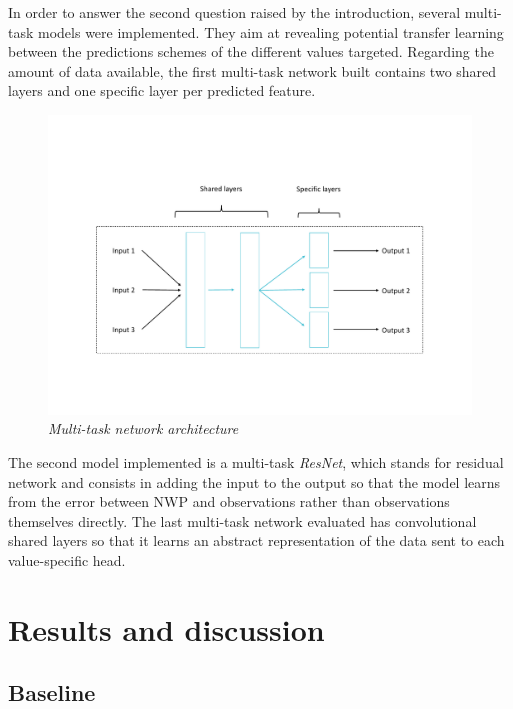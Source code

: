 \documentclass{article}
\newcommand{\saut}{\vspace{10px}}
\begin{document}
In order to answer the second question raised by the introduction, several multi-task models were implemented.
They aim at revealing potential transfer learning between the predictions schemes of the different values targeted.
Regarding the amount of data available, the first multi-task network built contains two shared layers and
one specific layer per predicted feature.

\vspace{-40px}

\begin{figure}[H]
    \centering
    \includegraphics[width=.9\linewidth]{img/heads.pdf}
    \vspace{-30px}
    \caption{\textit{Multi-task network architecture}}
    \label{fig:Fig. 3}
\end{figure}


\saut

The second model implemented is a multi-task \emph{ResNet}, which stands for residual network and consists in adding
the input to the output so that the model learns from the error between NWP and observations rather than observations
themselves directly.
The last multi-task network evaluated has convolutional shared layers so that it learns an abstract representation of the
data sent to each value-specific head.


\section{Results and discussion}
\subsection*{Baseline}
\end{document}
